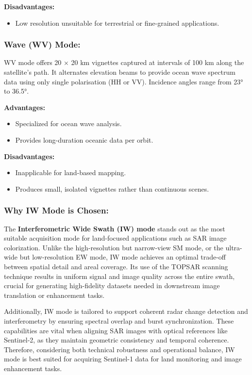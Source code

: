 \textbf{Disadvantages:}
\begin{itemize}
    \item Low resolution unsuitable for terrestrial or fine-grained applications.
\end{itemize}

\subsubsection{\textbf{Wave (WV) Mode: }}

WV mode offers 20 × 20 km vignettes captured at intervals of 100 km along the satellite's path. It alternates elevation beams to provide ocean wave spectrum data using only single polarisation (HH or VV). Incidence angles range from 23° to 36.5°.


\textbf{Advantages:}
\begin{itemize}
    \item Specialized for ocean wave analysis.
    \item Provides long-duration oceanic data per orbit.
\end{itemize}

\textbf{Disadvantages:}
\begin{itemize}
    \item Inapplicable for land-based mapping.
    \item Produces small, isolated vignettes rather than continuous scenes.
\end{itemize}

\subsubsection{\textbf{Why IW Mode is Chosen: }}

The \textbf{Interferometric Wide Swath (IW) mode} stands out as the most suitable acquisition mode for land-focused applications such as SAR image colorization. Unlike the high-resolution but narrow-view SM mode, or the ultra-wide but low-resolution EW mode, IW mode achieves an optimal trade-off between spatial detail and areal coverage. Its use of the TOPSAR scanning technique results in uniform signal and image quality across the entire swath, crucial for generating high-fidelity datasets needed in downstream image translation or enhancement tasks.

Additionally, IW mode is tailored to support coherent radar change detection and interferometry by ensuring spectral overlap and burst synchronization. These capabilities are vital when aligning SAR images with optical references like Sentinel‑2, as they maintain geometric consistency and temporal coherence. Therefore, considering both technical robustness and operational balance, IW mode is best suited for acquiring Sentinel-1 data for land monitoring and image enhancement tasks.




